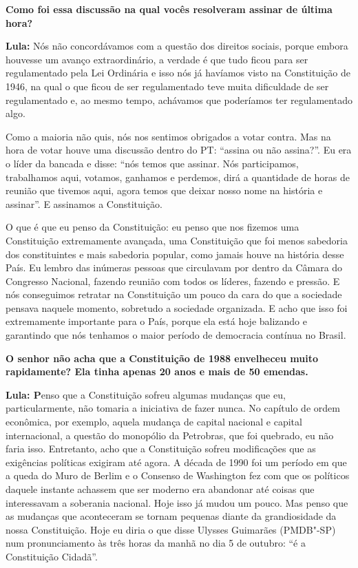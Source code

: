 \textbf{Como foi essa discussão na qual vocês resolveram assinar de
última hora? }

\textbf{Lula:} Nós não concordávamos com a questão dos direitos sociais,
porque embora houvesse um avanço extraordinário, a verdade é que tudo
ficou para ser regulamentado pela Lei Ordinária e isso nós já havíamos
visto na Constituição de 1946, na qual o que ficou de ser regulamentado
teve muita dificuldade de ser regulamentado e, ao mesmo tempo, achávamos
que poderíamos ter regulamentado algo.

Como a maioria não quis, nós nos sentimos obrigados a votar contra. Mas
na hora de votar houve uma discussão dentro do PT: ``assina ou não
assina?''. Eu era o líder da bancada e disse: ``nós temos que assinar.
Nós participamos, trabalhamos aqui, votamos, ganhamos e perdemos, dirá a
quantidade de horas de reunião que tivemos aqui, agora temos que deixar
nosso nome na história e assinar''. E assinamos a Constituição.

O que é que eu penso da Constituição: eu penso que nos fizemos uma
Constituição extremamente avançada, uma Constituição que foi menos
sabedoria dos constituintes e mais sabedoria popular, como jamais houve
na história desse País. Eu lembro das inúmeras pessoas que circulavam
por dentro da Câmara do Congresso Nacional, fazendo reunião com todos os
líderes, fazendo e pressão. E nós conseguimos retratar na Constituição
um pouco da cara do que a sociedade pensava naquele momento, sobretudo a
sociedade organizada. E acho que isso foi extremamente importante para o
País, porque ela está hoje balizando e garantindo que nós tenhamos o
maior período de democracia contínua no Brasil.

\textbf{O senhor não acha que a Constituição de 1988 envelheceu muito
rapidamente? Ela tinha apenas 20 anos e mais de 50 emendas.}

\textbf{Lula: P}enso que a Constituição sofreu algumas mudanças que eu,
particularmente, não tomaria a iniciativa de fazer nunca. No capítulo de
ordem econômica, por exemplo, aquela mudança de capital nacional e
capital internacional, a questão do monopólio da Petrobras, que foi
quebrado, eu não faria isso. Entretanto, acho que a Constituição sofreu
modificações que as exigências políticas exigiram até agora. A década de
1990 foi um período em que a queda do Muro de Berlim e o Consenso de
Washington fez com que os políticos daquele instante achassem que ser
moderno era abandonar até coisas que interessavam a soberania nacional.
Hoje isso já mudou um pouco. Mas penso que as mudanças que aconteceram
se tornam pequenas diante da grandiosidade da nossa Constituição. Hoje
eu diria o que disse Ulysses Guimarães (PMDB"-SP) num pronunciamento às
três horas da manhã no dia 5 de outubro: ``é a Constituição Cidadã''.

